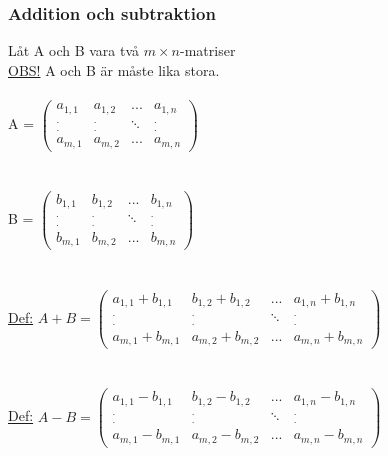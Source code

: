 \documentclass{article}
\begin{document}
    \subsubsection{Addition och subtraktion}
        Låt A och B vara två $m\times n$-matriser\\
        \underline{OBS!} A och B är måste lika stora.\\\\
        A = $\begin{pmatrix}
            a_{1,1} & a_{1,2} & ... & a_{1,n}\\
            ^{.}_{.} & ^{.}_{.} & \ddots & ^{.}_{.}\\
            a_{m,1} & a_{m,2} & ... & a_{m,n}
        \end{pmatrix}$\\\\\\
        B = $\begin{pmatrix}
            b_{1,1} & b_{1,2} & ... & b_{1,n}\\
            ^{.}_{.} & ^{.}_{.} & \ddots & ^{.}_{.}\\
            b_{m,1} & b_{m,2} & ... & b_{m,n}
        \end{pmatrix}$\\\\\\
        \underline{Def:} $A+B=\begin{pmatrix}
            a_{1,1}+b_{1,1} & b_{1,2}+b_{1,2} & ... & a_{1,n}+b_{1,n}\\
            ^{.}_{.} & ^{.}_{.} & \ddots & ^{.}_{.}\\
            a_{m,1} +b_{m,1} & a_{m,2}+b_{m,2} & ... & a_{m,n}+b_{m,n}
        \end{pmatrix}$\\\\\\
        \underline{Def:} $A-B=\begin{pmatrix}
            a_{1,1}-b_{1,1} & b_{1,2}-b_{1,2} & ... & a_{1,n}-b_{1,n}\\
            ^{.}_{.} & ^{.}_{.} & \ddots & ^{.}_{.}\\
            a_{m,1} -b_{m,1} & a_{m,2}-b_{m,2} & ... & a_{m,n}-b_{m,n}
        \end{pmatrix}$
        \clearpage
\end{document}
